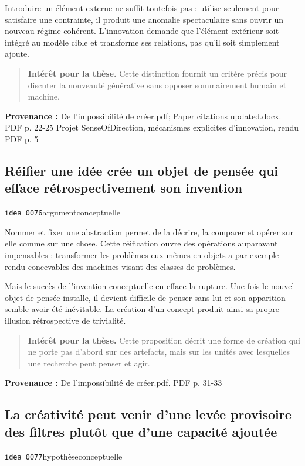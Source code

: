 \documentclass[10pt,a4paper]{article}
\begin{document}
Introduire un élément externe ne suffit toutefois pas : utilise seulement pour satisfaire une contrainte, il produit une anomalie spectaculaire sans ouvrir un nouveau régime cohérent. L'innovation demande que l'élément extérieur soit intégré au modèle cible et transforme ses relations, pas qu'il soit simplement ajoute.

\begin{quote}
\textbf{Intérêt pour la thèse.} Cette distinction fournit un critère précis pour discuter la nouveauté générative sans opposer sommairement humain et machine.
\end{quote}
{\footnotesize\color{metadata}\textbf{Provenance :} De l'impossibilité de créer.pdf; Paper citations updated.docx. PDF p. 22-25 Projet SenseOfDirection, mécanismes explicites d'innovation, rendu PDF p. 5\par}

\subsection{Réifier une idée crée un objet de pensée qui efface rétrospectivement son invention}
{\small\color{metadata} \texttt{idea\_0076}\quad\textbullet\quad argument\quad\textbullet\quad conceptuelle\par}

Nommer et fixer une abstraction permet de la décrire, la comparer et opérer sur elle comme sur une chose. Cette réification ouvre des opérations auparavant impensables : transformer les problèmes eux-mêmes en objets a par exemple rendu concevables des machines visant des classes de problèmes.

Mais le succès de l'invention conceptuelle en efface la rupture. Une fois le nouvel objet de pensée installe, il devient difficile de penser sans lui et son apparition semble avoir été inévitable. La création d'un concept produit ainsi sa propre illusion rétrospective de trivialité.

\begin{quote}
\textbf{Intérêt pour la thèse.} Cette proposition décrit une forme de création qui ne porte pas d'abord sur des artefacts, mais sur les unités avec lesquelles une recherche peut penser et agir.
\end{quote}
{\footnotesize\color{metadata}\textbf{Provenance :} De l'impossibilité de créer.pdf. PDF p. 31-33\par}

\subsection{La créativité peut venir d'une levée provisoire des filtres plutôt que d'une capacité ajoutée}
{\small\color{metadata} \texttt{idea\_0077}\quad\textbullet\quad hypothèse\quad\textbullet\quad conceptuelle\par}
\end{document}
